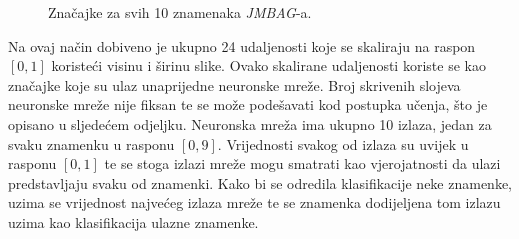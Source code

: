 \begin{figure}[htb]
    \centering
    \caption{Značajke za svih 10 znamenaka \emph{JMBAG}-a.}
    \label{fig:features-for-multiple-digits}
\end{figure}
Na ovaj način dobiveno je ukupno 24 udaljenosti koje se skaliraju na raspon $[0, 1]$ koristeći visinu i širinu slike.
Ovako skalirane udaljenosti koriste se kao značajke koje su ulaz unaprijedne neuronske mreže. Broj skrivenih slojeva
neuronske mreže nije fiksan te se može podešavati kod postupka učenja, što je opisano u sljedećem odjeljku. Neuronska
mreža ima ukupno 10 izlaza, jedan za svaku znamenku u rasponu $[0, 9]$. Vrijednosti svakog od izlaza su uvijek u rasponu
$[0, 1]$ te se stoga izlazi mreže mogu smatrati kao vjerojatnosti da ulazi predstavljaju svaku od znamenki. Kako bi se
odredila klasifikacije neke znamenke, uzima se vrijednost najvećeg izlaza mreže te se znamenka dodijeljena tom izlazu
uzima kao klasifikacija ulazne znamenke.


